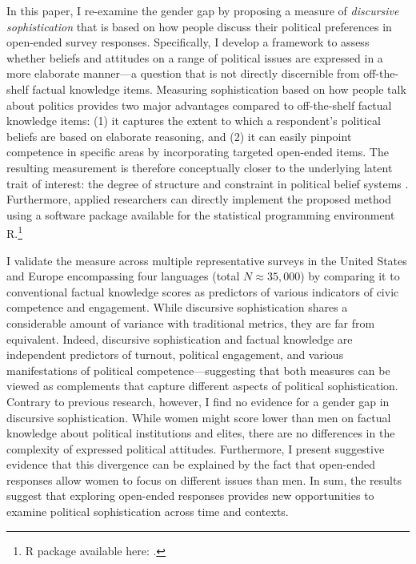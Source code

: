 In this paper, I re-examine the gender gap by proposing a measure of \textit{discursive sophistication} that is based on how people discuss their political preferences in open-ended survey responses. Specifically, I develop a framework to assess whether beliefs and attitudes on a range of political issues are expressed in a more elaborate manner---a question that is not directly discernible from off-the-shelf factual knowledge items. %
Measuring sophistication based on how people talk about politics provides two major advantages compared to off-the-shelf factual knowledge items: (1) it captures the extent to which a respondent's political beliefs are based on elaborate reasoning, and (2) it can easily pinpoint competence in specific areas by incorporating targeted open-ended items. The resulting measurement is therefore conceptually closer to the underlying latent trait of interest: the degree of structure and constraint in political belief systems \citep{tetlock1983cognitive,luskin1987measuring}. Furthermore, applied researchers can directly implement the proposed method using a software package available for the statistical programming environment R.\footnote{R package available here: .}

I validate the measure across multiple representative surveys in the United States and Europe encompassing four languages (total $N \approx 35,000$) by comparing it to conventional factual knowledge scores as predictors of various indicators of civic competence and engagement. While discursive sophistication shares a considerable amount of variance with traditional metrics, they are far from equivalent. Indeed, discursive sophistication and factual knowledge are independent predictors of turnout, political engagement, and various manifestations of political competence---suggesting that both measures can be viewed as complements that capture different aspects of political sophistication. Contrary to previous research, however, I find no evidence for a gender gap in discursive sophistication. While women might score lower than men on factual knowledge about political institutions and elites, there are no differences in the complexity of expressed political attitudes. Furthermore, I present suggestive evidence that this divergence can be explained by the fact that open-ended responses allow women to focus on different issues than men. In sum, the results suggest that exploring open-ended responses provides new opportunities to examine political sophistication across time and contexts.


